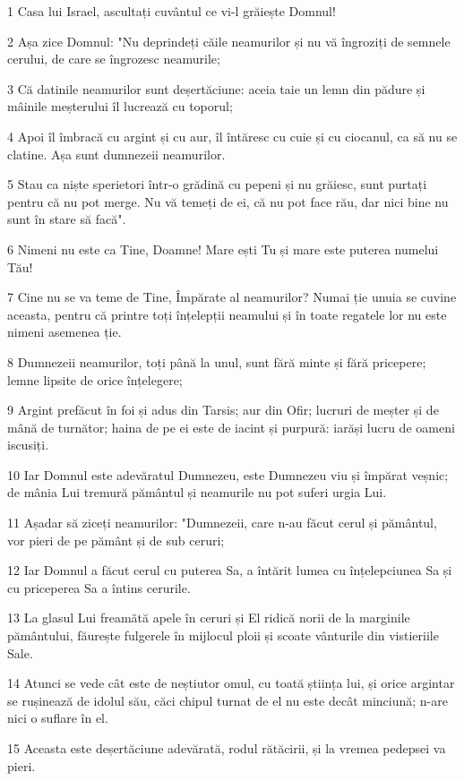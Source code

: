 \par 1 Casa lui Israel, ascultați cuvântul ce vi-l grăiește Domnul!
\par 2 Așa zice Domnul: "Nu deprindeți căile neamurilor și nu vă îngroziți de semnele cerului, de care se îngrozesc neamurile;
\par 3 Că datinile neamurilor sunt deșertăciune: aceia taie un lemn din pădure și mâinile meșterului îl lucrează cu toporul;
\par 4 Apoi îl îmbracă cu argint și cu aur, îl întăresc cu cuie și cu ciocanul, ca să nu se clatine. Așa sunt dumnezeii neamurilor.
\par 5 Stau ca niște sperietori într-o grădină cu pepeni și nu grăiesc, sunt purtați pentru că nu pot merge. Nu vă temeți de ei, că nu pot face rău, dar nici bine nu sunt în stare să facă".
\par 6 Nimeni nu este ca Tine, Doamne! Mare ești Tu și mare este puterea numelui Tău!
\par 7 Cine nu se va teme de Tine, Împărate al neamurilor? Numai ție unuia se cuvine aceasta, pentru că printre toți înțelepții neamului și în toate regatele lor nu este nimeni asemenea ție.
\par 8 Dumnezeii neamurilor, toți până la unul, sunt fără minte și fără pricepere; lemne lipsite de orice înțelegere;
\par 9 Argint prefăcut în foi și adus din Tarsis; aur din Ofir; lucruri de meșter și de mână de turnător; haina de pe ei este de iacint și purpură: iarăși lucru de oameni iscusiți.
\par 10 Iar Domnul este adevăratul Dumnezeu, este Dumnezeu viu și împărat veșnic; de mânia Lui tremură pământul și neamurile nu pot suferi urgia Lui.
\par 11 Așadar să ziceți neamurilor: "Dumnezeii, care n-au făcut cerul și pământul, vor pieri de pe pământ și de sub ceruri;
\par 12 Iar Domnul a făcut cerul cu puterea Sa, a întărit lumea cu înțelepciunea Sa și cu priceperea Sa a întins cerurile.
\par 13 La glasul Lui freamătă apele în ceruri și El ridică norii de la marginile pământului, făurește fulgerele în mijlocul ploii și scoate vânturile din vistieriile Sale.
\par 14 Atunci se vede cât este de neștiutor omul, cu toată știința lui, și orice argintar se rușinează de idolul său, căci chipul turnat de el nu este decât minciună; n-are nici o suflare în el.
\par 15 Aceasta este deșertăciune adevărată, rodul rătăcirii, și la vremea pedepsei va pieri.
